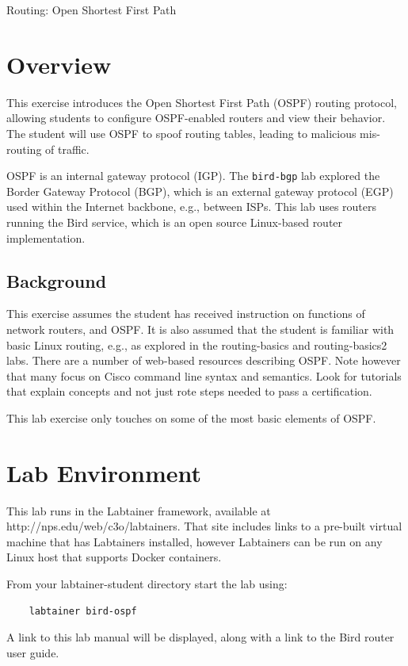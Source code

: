 


\begin{center}
{\LARGE Routing: Open Shortest First Path}
\vspace{0.1in}\\
\end{center}


\section{Overview}
This exercise introduces the Open Shortest First Path (OSPF) routing protocol,
allowing students to configure OSPF-enabled routers and view their behavior.
The student will use OSPF to spoof routing tables, leading to malicious mis-routing
of traffic.

OSPF is an internal gateway protocol (IGP).   The {\tt bird-bgp} lab explored the
Border Gateway Protocol (BGP), which is an external gateway protocol (EGP) used within the
Internet backbone, e.g., between ISPs.
This lab uses routers running the Bird service, which is an open source Linux-based router
implementation.

\subsection{Background}
This exercise assumes the student has received instruction on functions
of network routers, and OSPF.  
It is also assumed that the student is familiar with basic Linux routing, e.g., as explored in the
routing-basics and routing-basics2 labs.
There are a number of web-based resources describing OSPF.  Note however that many focus on Cisco
command line syntax and semantics.  Look for tutorials that explain concepts and not just rote 
steps needed to pass a certification.

This lab exercise only touches on some of the most basic elements of OSPF.

\section{Lab Environment}
This lab runs in the Labtainer framework,
available at http://nps.edu/web/c3o/labtainers.
That site includes links to a pre-built virtual machine
that has Labtainers installed, however Labtainers can
be run on any Linux host that supports Docker containers.

From your labtainer-student directory start the lab using:
\begin{verbatim}
    labtainer bird-ospf
\end{verbatim}
A link to this lab manual will be displayed, along with a link to the Bird router 
user guide.

